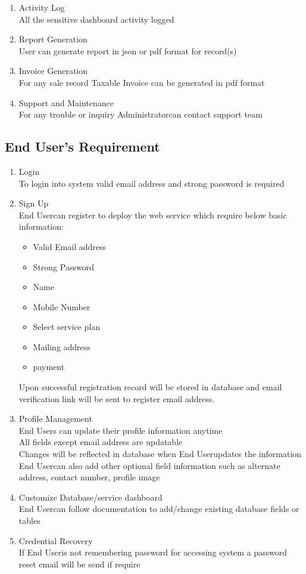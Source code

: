 \documentclass{scrreprt}
\newcommand*\arrow{\item[$\Rightarrow$]}
\def\admin{Administrator}
\def\user{End User}
\begin{document}
\begin{enumerate}[start=1,label={\bfseries REQ \arabic*:}]
	\item Activity Log
		\\All the sensitive dashboard activity logged 
	\item Report Generation
		\\User can generate report in json or pdf format for record(s)
	\item Invoice Generation
		\\For any sale record Taxable Invoice can be generated in pdf format
	\item Support and Maintenance
		\\For any trouble or inquiry \admin \space can contact support team
	
\end{enumerate}
\subsection{\user's Requirement}
\begin{enumerate}[start=1,label={\bfseries REQ \arabic*:}]
	\addtolength{\itemindent}{40pt}
	\item Login
		\\To login into system valid email address and strong password is required
	\item Sign Up
		\\ \user \space can register to deploy the web service which require below basic information:
			\begin{itemize}
				\arrow Valid Email address
				\arrow Strong Password
				\arrow Name
				\arrow Mobile Number
				\arrow Select service plan
				\arrow Mailing address
				\arrow payment
			\end{itemize}
		Upon successful registration record will be stored in database and email verification link will be sent to register email address.
	\item Profile Management
		\\ \user s can update their profile information anytime
		\\All fields except email address are updatable
		\\Changes will be reflected in database when \user \space updates the information
		\\ \user can also add other optional field information such as alternate address, contact number, profile image
	\item Customize Database/service dashboard
		\\ \user \space can follow documentation to add/change existing database fields or tables
	\item Credential Recovery
		\\If \user \space is not remembering password for accessing system a password reset email will be send if require 
\end{enumerate}
\end{document}
